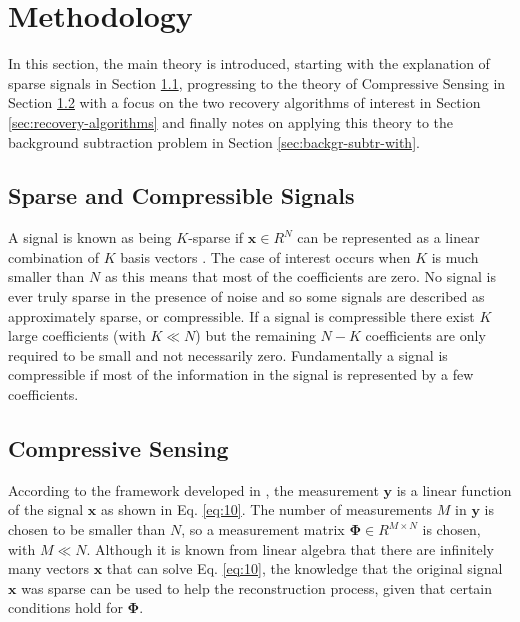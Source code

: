 \section{Methodology}
\label{sec:background}

In this section, the main theory is introduced, starting with the explanation of sparse signals in Section \ref{sec:compressible-signals}, progressing to the theory of Compressive Sensing in Section \ref{sec:compressive-sensing} with a focus on the two recovery algorithms of interest in Section \ref{sec:recovery-algorithms} and finally notes on applying this theory to the background subtraction problem in Section \ref{sec:backgr-subtr-with}.

\subsection{Sparse and Compressible Signals}

\label{sec:compressible-signals}
A signal is known as being $K$-sparse if $\boldsymbol{x} \in R^N$ can be represented as a linear combination of $K$ basis vectors \cite{Baraniuk2007}. The case of interest occurs when $K$ is much smaller than $N$ as this means that most of the coefficients are zero. No signal is ever truly sparse in the presence of noise and so some signals are described as approximately sparse, or compressible. If a signal is compressible there exist $K$ large coefficients (with $K \ll N$) but the remaining $N-K$ coefficients are only required to be small and not necessarily zero. Fundamentally a signal is compressible if most of the information in the signal is represented by a few coefficients.

\subsection{Compressive Sensing}
\label{sec:compressive-sensing}

According to the framework developed in \cite{Candes2006, Candes2006a, Donoho2006}, the measurement $\boldsymbol{y}$ is a linear function of the signal $\boldsymbol{x}$ as shown in Eq. \eqref{eq:10}. The number of measurements $M$ in $\boldsymbol{y}$ is chosen to be smaller than $N$, so a measurement matrix $\boldsymbol{\Phi} \in R^{M \times N}$ is chosen, with $M \ll N$. Although it is known from linear algebra that there are infinitely many vectors $\boldsymbol{x}$ that can solve Eq. \eqref{eq:10}, the knowledge that the original signal $\boldsymbol{x}$ was sparse can be used to help the reconstruction process, given that certain conditions hold for $\boldsymbol{\Phi}$. 

